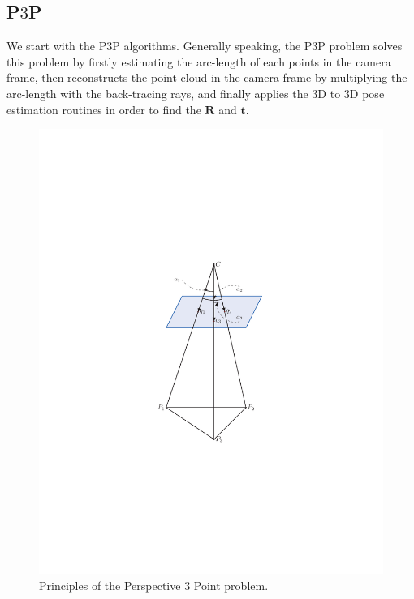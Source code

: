 \documentclass[a4paper]{report}
\begin{document}
\subsection{P$3$P}
We start with the P$3$P algorithms. Generally speaking, the P$3$P problem solves this problem by firstly estimating the arc-length of each points in the camera frame, then reconstructs the point cloud in the camera frame by multiplying the arc-length with the back-tracing rays, and finally applies the $3$D to $3$D pose estimation routines in order to find the $\mathbf{R}$ and $\mathbf{t}$.
\begin{figure}
\centering
\includegraphics[scale=0.8]{hand_eye_files/vision/figures/p3p.pdf}
\caption{Principles of the Perspective $3$ Point problem.}
\label{fig:p3p}
\end{figure}
\end{document}
